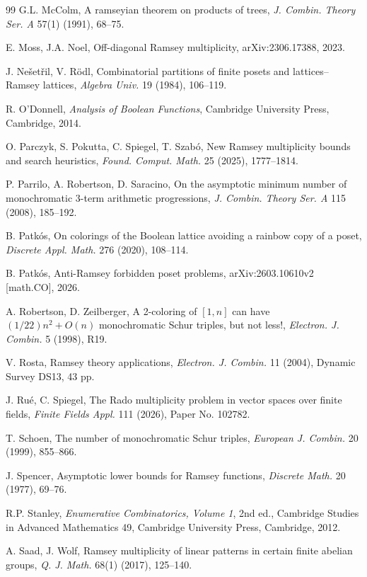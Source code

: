 \documentclass[twoside,12pt]{article}
\begin{document}
\begin{thebibliography}{99}
G.L. McColm, A ramseyian theorem on products of trees, \emph{J. Combin. Theory Ser. A} 57(1) (1991), 68--75.

E. Moss, J.A. Noel, Off-diagonal Ramsey multiplicity, arXiv:2306.17388, 2023.

J. Ne\v{s}et\v{r}il, V. R\"odl, Combinatorial partitions of finite posets and lattices--Ramsey lattices, \emph{Algebra Univ.} 19 (1984), 106--119.

R. O'Donnell, \emph{Analysis of Boolean Functions}, Cambridge University Press, Cambridge, 2014.

O. Parczyk, S. Pokutta, C. Spiegel, T. Szab\'o, New Ramsey multiplicity bounds and search heuristics, \emph{Found. Comput. Math.} 25 (2025), 1777--1814.

P. Parrilo, A. Robertson, D. Saracino, On the asymptotic minimum number of monochromatic $3$-term arithmetic progressions, \emph{J. Combin. Theory Ser. A} 115 (2008), 185--192.

B. Patk\'os, On colorings of the Boolean lattice avoiding a rainbow copy of a poset, \emph{Discrete Appl. Math.} 276 (2020), 108--114.

B. Patk\'os, 
Anti-Ramsey forbidden poset problems, arXiv:2603.10610v2 [math.CO], 2026. 

A. Robertson, D. Zeilberger, A 2-coloring of $[1,n]$ can have $(1/22)n^2+O(n)$ monochromatic Schur triples, but not less!, \emph{Electron. J. Combin.} 5 (1998), R19.

V. Rosta, Ramsey theory applications, \emph{Electron. J. Combin.} 11 (2004), Dynamic Survey DS13, 43 pp.

J. Ru\'e, C. Spiegel, The Rado multiplicity problem in vector spaces over finite fields, \emph{Finite Fields Appl.} 111 (2026), Paper No. 102782.

T. Schoen, The number of monochromatic Schur triples, \emph{European J. Combin.} 20 (1999), 855--866.

J. Spencer, Asymptotic lower bounds for Ramsey functions, \emph{Discrete Math.} 20 (1977), 69--76.

R.P. Stanley, \emph{Enumerative Combinatorics, Volume 1}, 2nd ed., Cambridge Studies in Advanced Mathematics 49, Cambridge University Press, Cambridge, 2012.

A. Saad, J. Wolf, Ramsey multiplicity of linear patterns in certain finite abelian groups, \emph{Q. J. Math.} 68(1) (2017), 125--140.


\end{thebibliography}
\end{document}

